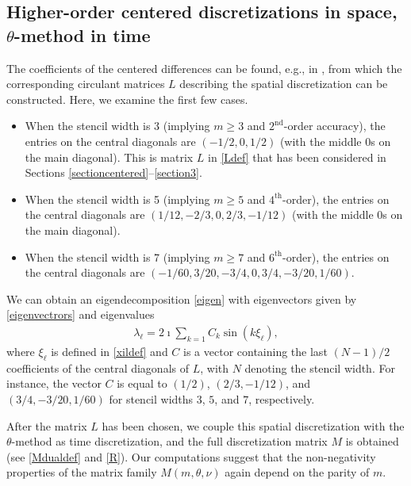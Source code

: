 \documentclass[a4paper]{article}
\begin{document}
\subsection{Higher-order centered discretizations in space, $\theta$-method in time}\label{highercentered}

The coefficients of the centered differences can be found, e.g., in \cite{bengt}, from which the corresponding circulant matrices $L$ describing the spatial discretization can be constructed.
Here, we examine the first few cases.
\begin{itemize}
\item When the stencil width is 3 (implying  $m\ge 3$ and $2^\text{nd}$-order accuracy), the entries on the central diagonals are $(-1/2, 0, 1/2)$ (with the middle 0s on the main diagonal). This is matrix $L$ in \eqref{Ldef} that has been considered in Sections \ref{sectioncentered}--\ref{section3}.
\item When the stencil width is 5 (implying  $m\ge 5$ and $4^\text{th}$-order), the entries on the central diagonals are $(1/12, -2/3, 0, 2/3, -1/12)$ (with the middle 0s on the main diagonal).
\item When the stencil width is 7 (implying $m\ge 7$ and $6^\text{th}$-order), the entries on the central diagonals are $(-1/60, 3/20, -3/4, 0, 3/4, -3/20, 1/60)$.
\end{itemize}
We can obtain an eigendecomposition \eqref{eigen} with eigenvectors given by \eqref{eigenvectrors} and
eigenvalues
\begin{align*}
	\lambda_\ell = 2\imath \sum_{k=1} C_k \sin(k\xi_\ell),
\end{align*}
where $\xi_\ell$ is defined in \eqref{xildef} and $C$ is a vector containing the last $(N-1)/2$ coefficients of the central diagonals of $L$, with $N$ denoting the stencil width.
For instance, the vector $C$ is equal to $(1/2)$, $(2/3,-1/12)$, and $(3/4,-3/20,1/60)$ for stencil widths
$3$, $5$, and $7$, respectively.

After the matrix $L$ has been chosen, we couple this spatial discretization with the $\theta$-method as time discretization, and the full discretization matrix $M$ is obtained (see \eqref{Mdualdef} and \eqref{R}). 
Our computations suggest that the non-negativity properties of the matrix family $M(m,\theta,\nu)$ again depend on the parity of $m$. 
\end{document}
